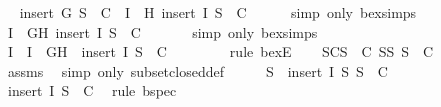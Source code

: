 \begin{isabellebody}
\ \isamarkupfalse%
\ {\isachardoublequoteopen}insert\ G\ {\isacharquery}S\ {\isasymin}\ C\ {\isasymor}\ {\isacharparenleft}{\isasymexists}I\ {\isasymin}\ {\isacharbraceleft}H{\isacharbraceright}{\isachardot}\ insert\ I\ {\isacharquery}S\ {\isasymin}\ C{\isacharparenright}{\isachardoublequoteclose}\isanewline
\ \ \ \ \isamarkupfalse%
\ {\isacharparenleft}simp\ only{\isacharcolon}\ bex{\isacharunderscore}simps{\isacharparenleft}{}{\isacharparenright}{\isacharparenright}\isanewline
\ \ \isamarkupfalse%
\ \isamarkupfalse%
\ {}{\isacharcolon}{\isachardoublequoteopen}{\isasymexists}I\ {\isasymin}\ {\isacharbraceleft}G{\isacharcomma}H{\isacharbraceright}{\isachardot}\ insert\ I\ {\isacharquery}S\ {\isasymin}\ C{\isachardoublequoteclose}\ \isanewline
\ \ \ \ \isamarkupfalse%
\ {\isacharparenleft}simp\ only{\isacharcolon}\ bex{\isacharunderscore}simps{\isacharparenleft}{}{\isacharparenright}{\isacharparenright}\isanewline
\ \ \isamarkupfalse%
\ I\ \ {\isachardoublequoteopen}I\ {\isasymin}\ {\isacharbraceleft}G{\isacharcomma}H{\isacharbraceright}{\isachardoublequoteclose}\ \ {\isachardoublequoteopen}insert\ I\ {\isacharquery}S\ {\isasymin}\ C{\isachardoublequoteclose}\isanewline
\ \ \ \ \isamarkupfalse%
\ {}\ \isamarkupfalse%
\ {\isacharparenleft}rule\ bexE{\isacharparenright}\isanewline
\ \ \isamarkupfalse%
\ SC{\isacharcolon}{\isachardoublequoteopen}{\isasymforall}S\ {\isasymin}\ C{\isachardot}\ {\isasymforall}S{\isacharprime}{\isasymsubseteq}S{\isachardot}\ S{\isacharprime}\ {\isasymin}\ C{\isachardoublequoteclose}\isanewline
\ \ \ \ \isamarkupfalse%
\ assms{\isacharparenleft}{}{\isacharparenright}\ \isamarkupfalse%
\ {\isacharparenleft}simp\ only{\isacharcolon}\ subset{\isacharunderscore}closed{\isacharunderscore}def{\isacharparenright}\isanewline
\ \ \isamarkupfalse%
\ \isamarkupfalse%
\ {}{\isacharcolon}{\isachardoublequoteopen}{\isasymforall}S{\isacharprime}\ {\isasymsubseteq}\ {\isacharparenleft}insert\ I\ {\isacharquery}S{\isacharparenright}{\isachardot}\ S{\isacharprime}\ {\isasymin}\ C{\isachardoublequoteclose}\isanewline
\ \ \ \ \isamarkupfalse%
\ {\isacartoucheopen}insert\ I\ {\isacharquery}S\ {\isasymin}\ C{\isacartoucheclose}\ \isamarkupfalse%
\ {\isacharparenleft}rule\ bspec{\isacharparenright}\isanewline

\end{isabellebody}
